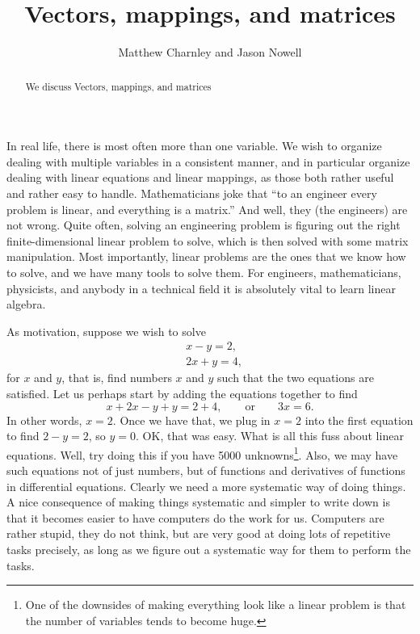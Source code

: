 \documentclass{ximera}
\title{Vectors, mappings, and matrices}
\author{Matthew Charnley and Jason Nowell}
\begin{document}
\begin{abstract}
    We discuss Vectors, mappings, and matrices
\end{abstract}
\maketitle

\label{vecsandmaps:section}



In real life, there is most often more than one variable. We wish to organize dealing with multiple variables in a consistent manner, and in particular organize dealing with linear equations and linear mappings, as those both rather useful and rather easy to handle. Mathematicians joke that ``to an engineer every problem is linear, and everything is a matrix.'' And well, they (the engineers) are not wrong. Quite often, solving an engineering problem is figuring out the right finite-dimensional linear problem to solve, which is then solved with some matrix manipulation. Most importantly, linear problems are the ones that we know how to solve, and we have many tools to solve them. For engineers, mathematicians, physicists, and anybody in a technical field it is absolutely vital to learn linear algebra. 

As motivation, suppose we wish to solve
\begin{equation*}
    \begin{aligned}
        & x-y = 2 , \\
        & 2x+y = 4 ,
    \end{aligned}
\end{equation*}
for $x$ and $y$, that is, find numbers $x$ and $y$ such that the two equations are satisfied. Let us perhaps start by adding the equations together to find
\begin{equation*}
    x+2x-y+y = 2+4, \qquad \text{or} \qquad 3x = 6 .
\end{equation*}
In other words, $x=2$.  Once we have that, we plug in $x=2$ into the first equation to find $2-y=2$, so $y=0$. OK\@, that was easy.  What is all this fuss about linear equations.  Well, try doing this if you have 5000 unknowns\footnote{One of the downsides of making everything look like a linear problem is that the number of variables tends to become huge.}. Also, we may have such equations not of just numbers, but of functions and derivatives of functions in differential equations. Clearly we need a more systematic way of doing things. A nice consequence of making things systematic and simpler to write down is that it becomes easier to have computers do the work for us. Computers are rather stupid, they do not think, but are very good at doing lots of repetitive tasks precisely, as long as we figure out a systematic way for them to perform the tasks.
\end{document}
